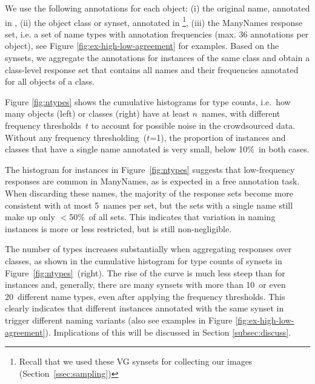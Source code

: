 We use the following annotations for each object: (i) the original name, annotated in \vg, (ii) the object class or synset, annotated in \vg\footnote{Recall that we used these VG synsets for collecting our images (Section~\ref{ssec:sampling})},
 (iii) the ManyNames response set, i.e. a set of name types with annotation frequencies (max. 36 annotations per object),  see Figure \ref{fig:ex-high-low-agreement} for examples.
 Based on the \vg synsets, we aggregate the annotations for instances of the same class and obtain a class-level response set that contains all names and their frequencies annotated for all objects of a class. 
 
Figure \ref{fig:ntypes} shows the cumulative histograms for type counts, i.e.\ how many objects (left) or classes (right) have at least $n$\ names, with different frequency thresholds~$t$ to account for possible noise in the crowdsourced data.
Without any frequency thresholding~\mbox{($t$=1)}, the proportion of instances and classes that have a single name annotated is very small, below 10\%\ in both cases. 

The histogram for instances in Figure\ \ref{fig:ntypes} suggests that low-frequency responses are common in ManyNames, as is expected in a free annotation task.
When discarding these names, the %
majority of the response sets become more consistent with at most 5\ names per set, 
but the sets with a single name still make up only $<$50\%\ of all sets. 
This indicates that variation in naming instances is more or less restricted, but is still non-negligible. 

The number of types increases substantially when aggregating responses over classes, as shown in the cumulative histogram for type counts of synsets in Figure\ \ref{fig:ntypes}\ (right).
The rise of the curve is much less steep than for instances and, generally, there are many synsets with more than 10\ or even 20\ different name types, even after applying the frequency thresholds. This clearly indicates that different instances annotated with the same 
synset in \vg trigger different naming variants (also see examples in Figure \ref{fig:ex-high-low-agreement}). 
Implications of this will be discussed in Section \ref{subsec:discuss}.


